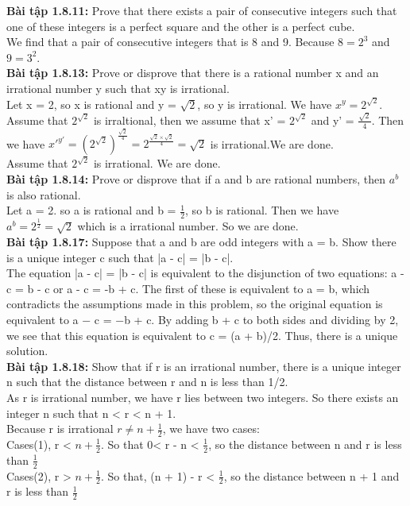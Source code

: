 \documentclass[a4paper]{article}
\begin{document}
\begin{enumerate}
\textbf{Bài tập 1.8.11:}  Prove that there exists a pair of consecutive integers such that one of these integers is a perfect square and the other is a perfect cube.\\
We find that a pair of consecutive integers that is 8 and 9. Because $8 = 2^{3}$ and $9 = 3^{2}$.\\

\textbf{Bài tập 1.8.13:} Prove or disprove that there is a rational number x and an irrational number y such that xy is irrational.\\
Let x = 2, so x is rational and y = $\sqrt{2}$, so y is irrational. We have $x^{y} = 2^{\sqrt{2}}$.\\
Assume that $2^{\sqrt{2}}$ is irraltional, then we assume that x' = $2^{\sqrt{2}}$ and y' = $\frac{\sqrt{2}}{4}$. Then we have $x'^{y'} = (2^{\sqrt{2}})^{\frac{\sqrt{2}}{4}} = 2^{\frac{\sqrt{2} \times \sqrt{2}}{4}} = \sqrt{2}$ is irrational.We are done.\\
Assume that $2^{\sqrt{2}}$ is irrational. We are done.\\

\textbf{Bài tập 1.8.14:}  Prove or disprove that if a and b are rational numbers,
then $a^{b}$ is also rational.\\
Let a = 2. so a is rational and b = $\frac{1}{2}$, so b is rational. Then we have $a^{b} = 2^{\frac{1}{2}} = \sqrt{2}$ which is a irrational number. So we are done.\\

\textbf{Bài tập 1.8.17:} Suppose that a and b are odd integers with a = b. Show there is a unique integer c such that |a - c| = |b - c|.\\
The equation |a - c| = |b - c| is equivalent to the disjunction of two equations: a - c = b - c or a - c = -b + c. The first of these is equivalent to a = b, which contradicts the assumptions made in this problem, so the original equation is equivalent to a − c = −b + c. By adding b + c to both sides and dividing by 2, we see that this equation is equivalent to c = (a + b)/2. Thus, there is a unique solution.\\

\textbf{Bài tập 1.8.18:} Show that if r is an irrational number, there is a unique integer n such that the distance between r and n is less than 1/2.\\
As r is irrational number, we have r lies between two integers. So there exists an integer n such that n < r < n + 1.\\
Because r is irrational $r \ne n + \frac{1}{2}$, we have two cases:\\
Cases(1), r < $n + \frac{1}{2}$. So that 0< r - n < $\frac{1}{2}$, so the distance between n and r is less than $\frac{1}{2}$\\
Cases(2), r > $n + \frac{1}{2}$. So that, (n + 1) - r < $\frac{1}{2}$, so the distance between n + 1 and r is less than $\frac{1}{2}$\\


\end{enumerate}
\end{document}
